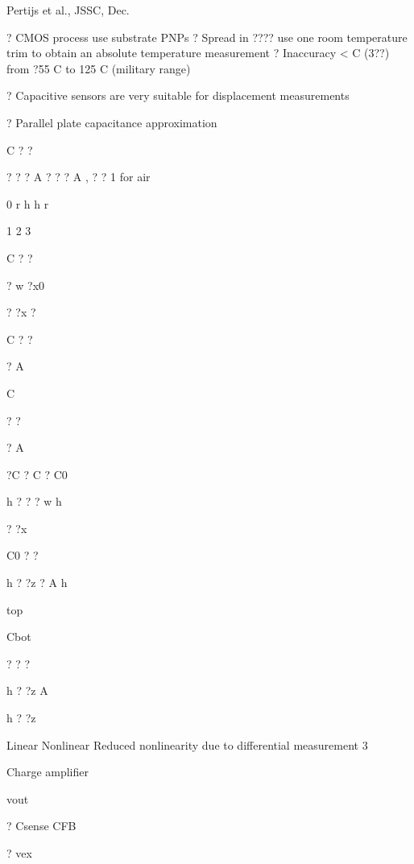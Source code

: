 \documentclass[2pt,landscape]{article}
\begin{document}
\begin{multicols*}{5}
Pertijs et al., JSSC, Dec. 


?	CMOS process	use substrate PNPs
?	Spread in ????	use one room temperature trim to obtain an absolute 
temperature measurement
?	Inaccuracy <  \textbullet C (3??) from ?55 \textbullet C to 125 \textbullet C (military range)



?	Capacitive sensors are very suitable for displacement measurements


?	Parallel plate capacitance approximation


C ? ?


? ? ? A ? ? ? A , ? ? 1 for air



0	r	h	h	r



1	2	3






C ? ?


? w ?x0


? ?x ?



C ? ?


?	A	



C

? ?


?	A	



?C ? C ? C0


h
? ? ? w
h



? ?x



C0 ? ?


h ? ?z
? A h


top


Cbot



? ? ?


h ? ?z A

h ? ?z


Linear	Nonlinear	Reduced nonlinearity due to 
differential measurement
3



Charge amplifier


vout


? Csense
CFB


? vex









\end{multicols*}
\end{document}
